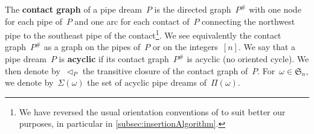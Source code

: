 \documentclass{amsart}
\theoremstyle{definition}
\newcommand{\N}{\mathbb{N}} %
\newcommand{\eqdef}{\mbox{\,\raisebox{0.2ex}{\scriptsize\ensuremath{\mathrm:}}\ensuremath{=}\,}} %
\newcommand{\defn}[1]{\textbf{\textsf{\color{PineGreen} #1}}} %
\newcommand{\vincent}[1]{\todo[color=blue!30]{#1 \\ \hfill --- V.}}
\newcommand{\fS}{\mathfrak{S}} %
\newcommand{\pipeDreams}{\Pi} %
\newcommand{\contact}{^\#} %
\newcommand{\acyclicPipeDreams}{\Sigma} %
\newcommand{\less}{\vartriangleleft} %
\newcommand{\contactLess}[1]{\less_{#1}} %
\begin{document}
The \defn{contact graph} of a pipe dream~$P$ is the directed graph~$P\contact$ with one node for each pipe of~$P$ and one arc for each contact of~$P$ connecting the northwest pipe to the southeast pipe of the contact\footnote{We have reversed the usual orientation conventions of \cite{PilaudSantos-brickPolytope, PilaudPocchiola, Pilaud-BrickAlgebra} to suit better our purposes, in particular in \cref{subsec:insertionAlgorithm}.}.
We see equivalently the contact graph~$P\contact$ as a graph on the pipes of~$P$ or on the integers~$[n]$.
We say that a pipe dream~$P$ is \defn{acyclic} if its contact graph~$P\contact$ is acyclic (no oriented cycle).
We then denote by~$\contactLess{P}$ the transitive closure of the contact graph of~$P$.
For~$\omega \in \fS_n$, we denote by~$\acyclicPipeDreams(\omega)$ the set of acyclic pipe dreams of~$\pipeDreams(\omega)$.
\end{document}
